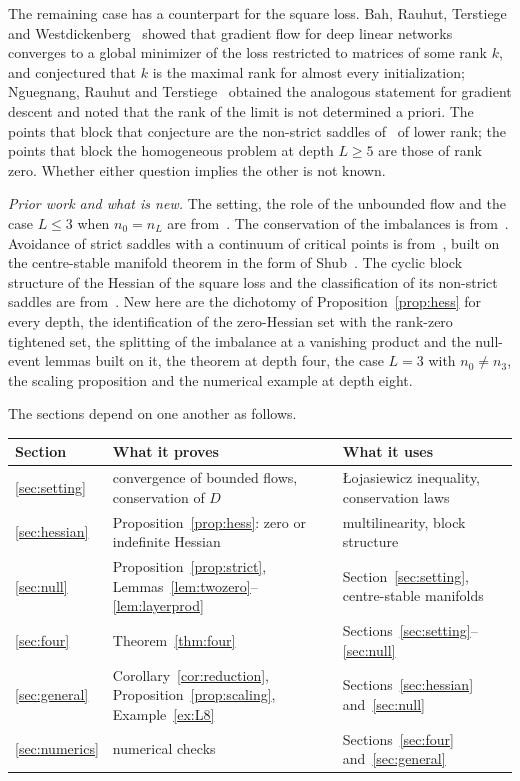 \documentclass[11pt]{amsart}
\theoremstyle{definition}
\theoremstyle{remark}
\numberwithin{equation}{section}
\begin{document}
The remaining case has a counterpart for the square loss. Bah, Rauhut, Terstiege and Westdickenberg~\cite{BRTW} showed that gradient flow for deep linear networks converges to a global minimizer of the loss restricted to matrices of some rank $k$, and conjectured that $k$ is the maximal rank for almost every initialization; Nguegnang, Rauhut and Terstiege~\cite{NRT} obtained the analogous statement for gradient descent and noted that the rank of the limit is not determined a priori. The points that block that conjecture are the non-strict saddles of~\cite{AMG} of lower rank; the points that block the homogeneous problem at depth $L\ge5$ are those of rank zero. Whether either question implies the other is not known.

\medskip
\noindent\emph{Prior work and what is new.} The setting, the role of the unbounded flow and the case $L\le3$ when $n_0=n_L$ are from~\cite{JGSHG}. The conservation of the imbalances is from~\cite{ACH,DHL}. Avoidance of strict saddles with a continuum of critical points is from~\cite{LSJR,PP,LPPSJR}, built on the centre-stable manifold theorem in the form of Shub~\cite{Shub}. The cyclic block structure of the Hessian of the square loss and the classification of its non-strict saddles are from~\cite{AMG}. New here are the dichotomy of Proposition~\ref{prop:hess} for every depth, the identification of the zero-Hessian set with the rank-zero tightened set, the splitting of the imbalance at a vanishing product and the null-event lemmas built on it, the theorem at depth four, the case $L=3$ with $n_0\ne n_3$, the scaling proposition and the numerical example at depth eight.

The sections depend on one another as follows.
\begin{center}
\small
\begin{tabular}{@{}lll@{}}
\toprule
Section & What it proves & What it uses\\ \midrule
\ref{sec:setting} & convergence of bounded flows, conservation of $D$ & \L{}ojasiewicz inequality, conservation laws\\
\ref{sec:hessian} & Proposition~\ref{prop:hess}: zero or indefinite Hessian & multilinearity, block structure\\
\ref{sec:null} & Proposition~\ref{prop:strict}, Lemmas~\ref{lem:twozero}--\ref{lem:layerprod} & Section~\ref{sec:setting}, centre-stable manifolds\\
\ref{sec:four} & Theorem~\ref{thm:four} & Sections~\ref{sec:setting}--\ref{sec:null}\\
\ref{sec:general} & Corollary~\ref{cor:reduction}, Proposition~\ref{prop:scaling}, Example~\ref{ex:L8} & Sections~\ref{sec:hessian} and~\ref{sec:null}\\
\ref{sec:numerics} & numerical checks & Sections~\ref{sec:four} and~\ref{sec:general}\\ \bottomrule
\end{tabular}
\end{center}
\end{document}
